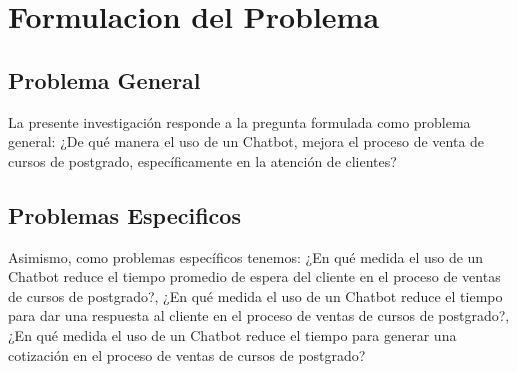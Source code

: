 \documentclass[10pt,a4paper]{article}
\begin{document}
	
	\section{Formulacion del Problema}
		    
	\subsection{Problema General}

	La presente investigación responde a la pregunta formulada como problema  general: ¿De qué manera el uso de un Chatbot, mejora el proceso de venta de cursos de postgrado, específicamente en la atención de clientes?
 

    \subsection{Problemas Especificos}
	Asimismo, como problemas específicos tenemos: ¿En qué medida el uso de  un Chatbot reduce el tiempo promedio de espera del cliente en el proceso de ventas  de cursos de postgrado?, ¿En qué medida el uso  de un Chatbot reduce el tiempo para dar una respuesta al cliente en el proceso de  ventas de cursos de postgrado?, ¿En qué medida  el uso de un Chatbot reduce el tiempo para generar una cotización en el proceso de  ventas de cursos de postgrado?

 		    
	
\end{document}
